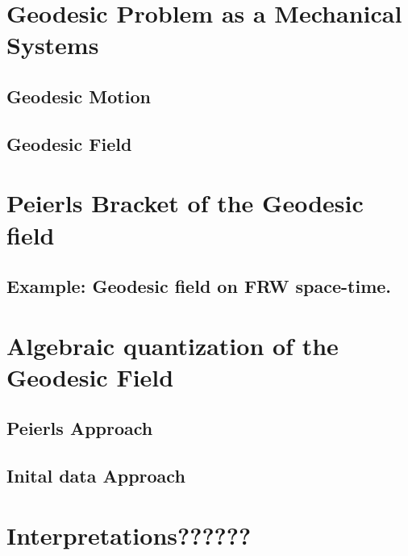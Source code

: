 \documentclass[Main]{subfiles}
\begin{document}
\section{Geodesic Problem as a Mechanical Systems}

\subsection{Geodesic Motion}

\subsection{Geodesic Field}


\section{Peierls Bracket of the Geodesic field}

\subsection{Example: Geodesic field on FRW space-time.}

\section{Algebraic quantization of the Geodesic Field}
\subsection{Peierls Approach}
\subsection{Inital data Approach}

\section{Interpretations??????}
\end{document}
